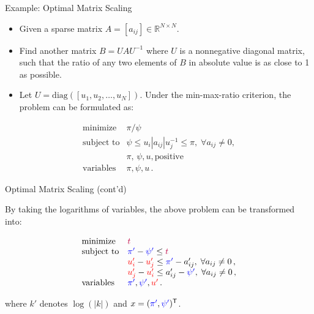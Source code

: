 \documentclass[10pt,ignorenonframetext,serif,onlymath]{beamer}
\begin{document}
\begin{frame}{Example: Optimal Matrix Scaling}
\protect\hypertarget{example-optimal-matrix-scaling}{}

\begin{itemize}
\item
  Given a sparse matrix \(A = [a_{ij}] \in \mathbb{R}^{N\times N}\).
\item
  Find another matrix \(B = U A U^{-1}\) where \(U\) is a nonnegative
  diagonal matrix, such that the ratio of any two elements of \(B\) in
  absolute value is as close to 1 as possible.
\item
  Let \(U = \mathrm{diag}([u_1, u_2, \ldots, u_N])\). Under the
  min-max-ratio criterion, the problem can be formulated as:
\end{itemize}

\[\begin{array}{ll}
  \text{minimize}   &   \pi/\psi  \\
  \text{subject to} &   \psi \leq u_i |a_{ij}| u_j^{-1} \leq \pi, \; \forall a_{ij} \neq 0 , \\
                    &   \pi, \, \psi, u, \text{positive} \\
  \text{variables}  &   \pi, \psi, u \, .
  \end{array}\]

\end{frame}

\begin{frame}{Optimal Matrix Scaling (cont’d)}
\protect\hypertarget{optimal-matrix-scaling-contd}{}

By taking the logarithms of variables, the above problem can be
transformed into:

\[\begin{array}{ll}
  \text{minimize}   &   {\color{purple}t} \\
  \text{subject to} &   {\color{blue}\pi'} - {\color{blue}\psi'} \leq {\color{purple}t} \\
                    &   {\color{red}u_i'} - {\color{red}u_j'}  \leq {\color{blue}\pi'} - a_{ij}', \; \forall a_{ij} \neq 0 \,, \\
                    &   {\color{red}u_j'} - {\color{red}u_i'} \leq a_{ij}' - {\color{blue}\psi'}, \; \forall a_{ij} \neq 0 \,, \\
  \text{variables}  &   {\color{blue}\pi'}, {\color{blue}\psi'}, {\color{red}u'} \, .
  \end{array}\]

where \(k'\) denotes \(\log( | k | )\) and
\(x = ({\color{blue}\pi'}, {\color{blue}\psi'} )^\mathsf{T}\).

\end{frame}
\end{document}
